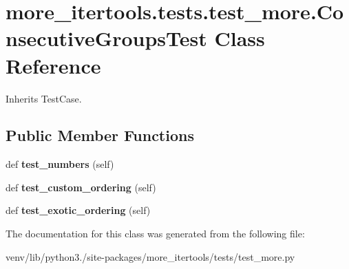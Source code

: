 \hypertarget{classmore__itertools_1_1tests_1_1test__more_1_1_consecutive_groups_test}{}\section{more\+\_\+itertools.\+tests.\+test\+\_\+more.\+Consecutive\+Groups\+Test Class Reference}
\label{classmore__itertools_1_1tests_1_1test__more_1_1_consecutive_groups_test}


Inherits Test\+Case.

\subsection*{Public Member Functions}
\begin{DoxyCompactItemize}
\item 
\mbox{\label{classmore__itertools_1_1tests_1_1test__more_1_1_consecutive_groups_test_a14f103e391def18af62cf840de934962}} 
def {\bfseries test\+\_\+numbers} (self)
\item 
\mbox{\label{classmore__itertools_1_1tests_1_1test__more_1_1_consecutive_groups_test_aab080999407733a551b96a5a97827ee7}} 
def {\bfseries test\+\_\+custom\+\_\+ordering} (self)
\item 
\mbox{\label{classmore__itertools_1_1tests_1_1test__more_1_1_consecutive_groups_test_a703e1b3ef6c3e300d39c54d06d5a1914}} 
def {\bfseries test\+\_\+exotic\+\_\+ordering} (self)
\end{DoxyCompactItemize}


The documentation for this class was generated from the following file\+:\begin{DoxyCompactItemize}
\item 
venv/lib/python3./site-\/packages/more\+\_\+itertools/tests/test\+\_\+more.\+py\end{DoxyCompactItemize}
